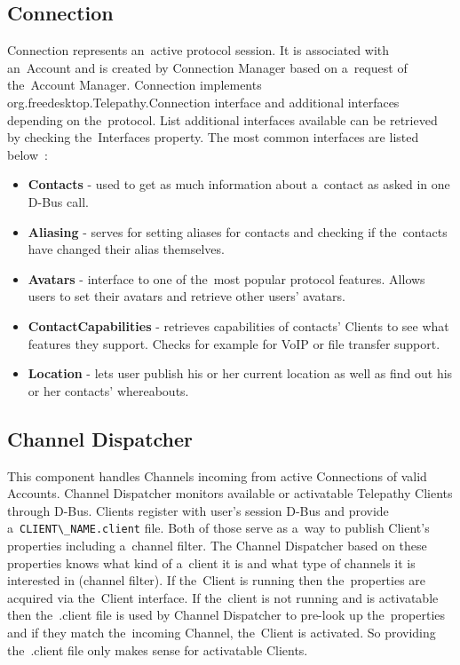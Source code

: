 \subsection*{Connection}
Connection represents an~active protocol session. It is associated with an~Account and is created by Connection Manager based on a~request of the~Account Manager. Connection implements org.freedesktop.Telepathy.Connection interface and additional interfaces depending on the~protocol. List additional interfaces available can be retrieved by checking the~Interfaces property. The most common interfaces are listed below~\cite{TPWiki}:

\begin{itemize}

	\item {\bf Contacts} - used to get as much information about a~contact as asked in one D-Bus call.

	\item {\bf Aliasing} - serves for setting aliases for contacts and checking if the~contacts have changed their alias themselves. 

	\item {\bf Avatars} - interface to one of the~most popular protocol features. Allows users to set their avatars and retrieve other users' avatars.

	\item {\bf ContactCapabilities} - retrieves capabilities of contacts' Clients to see what features they support. Checks for example for VoIP or file transfer support.

	\item {\bf Location} - lets user publish his or her current location as well as find out his or her contacts' whereabouts. 

\end{itemize}

\subsection*{Channel Dispatcher}
This component handles Channels incoming from active Connections of valid Accounts. Channel Dispatcher monitors available or activatable Telepathy Clients through D-Bus. Clients register with user's session D-Bus and provide a~\verb|CLIENT\_NAME.client| file. Both of those serve as a~way to publish Client's properties including a~channel filter. The Channel Dispatcher based on these properties knows what kind of a~client it is and what type of channels it is interested in (channel filter). If the~Client is running then the~properties are acquired via the~Client interface. If the~client is not running and is activatable then the~.client file is used by Channel Dispatcher to pre-look up the~properties and if they match the~incoming Channel, the~Client is activated. So providing the~.client file only makes sense for activatable Clients.  

